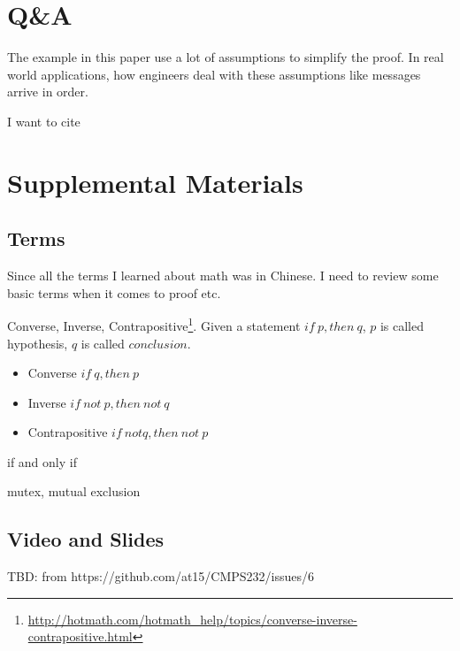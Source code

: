 \documentclass[12pt,a4paper,oneside]{article}
\begin{document}
\section{Q\&A}

The example in this paper use a lot of assumptions to simplify the proof.
In real world applications, how engineers deal with these assumptions like messages
arrive in order.

I want to cite\cite{lamport1978time}

\section{Supplemental Materials}

\subsection{Terms} \label{l1}

Since all the terms I learned about math was in Chinese. I need to review some basic
terms when it comes to proof etc.

\medskip

Converse, Inverse, Contrapositive\footnote{\url{http://hotmath.com/hotmath_help/topics/converse-inverse-contrapositive.html}}.
Given a statement $if\ p, then\ q$, $p$ is called hypothesis, $q$ is called $conclusion$.

\begin{itemize}
    \item Converse  $if\ q, then\ p$
    \item Inverse $if\ not\ p, then\ not\ q$
    \item Contrapositive $if\ not q, then\ not\ p$
\end{itemize}

if and only if

mutex, mutual exclusion

\subsection{Video and Slides}

TBD: from https://github.com/at15/CMPS232/issues/6

\printbibliography
\end{document}
